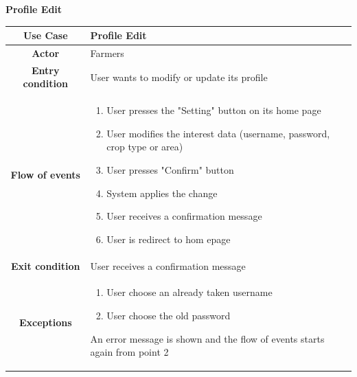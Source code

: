 \documentclass[table, 12pt]{article}
\begin{document}
\begin{itemize}
            \begin{table}[H]
                \item[] \textbf{Profile Edit}
                \item[] 
                \centering
                \begin{tabular}{|c |m{}|}
                    \hline
                    \textbf{Use Case} & Profile Edit\\ \hline
                    \textbf{Actor} & Farmers\\ \hline
                    \textbf{Entry condition} & User wants to modify or update its profile\\  \hline
                    \textbf{Flow of events} & \begin{enumerate}
                                                \item User presses the "Setting" button on its home page
                                                \item User modifies the interest data (username, password, crop type or area)
                                                \item User presses "Confirm" button
                                                \item System applies the change
                                                \item User receives a confirmation message
                                                \item User is redirect to hom epage
                                            \end{enumerate}\\ \hline
                    \textbf{Exit condition} & User receives a confirmation message\\ \hline
                    \textbf{Exceptions} &  \begin{enumerate}
                        \item User choose an already taken username
                        \item User choose the old password
                    \end{enumerate}
                    An error message is shown and the flow of events starts again from point 2\\ \hline                    
                \end{tabular}
            \end{table}


\end{itemize}
\end{document}
